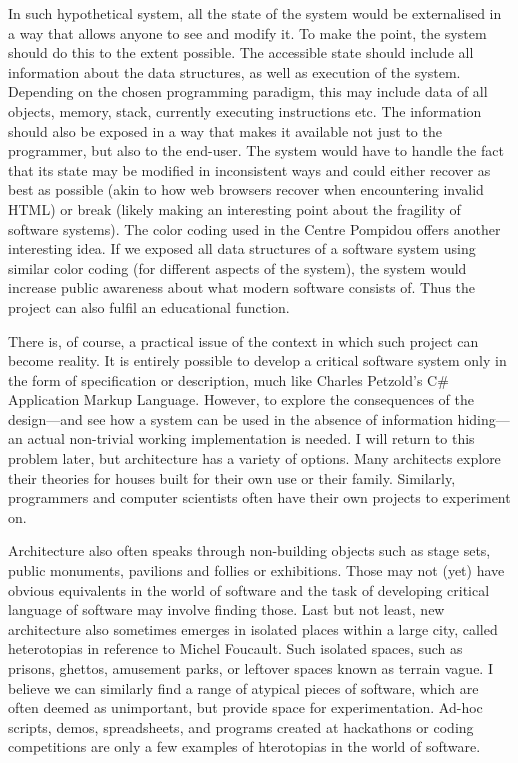 In such hypothetical system, all the state of the system
would be externalised in a way that allows anyone to see and modify it. To make the point,
the system should do this to the extent possible. The accessible state should include all
information about the data structures, as well as execution of the system. Depending on the
chosen programming paradigm, this may include data of all objects, memory, stack, currently
executing instructions etc. The information should also be exposed in a way that makes it
available not just to the programmer, but also to the end-user. The system would have to handle the fact that
its state may be modified in inconsistent ways and could either recover as best as possible
(akin to how web browsers recover when encountering invalid HTML) or break (likely making an
interesting point about the fragility of software systems).
The color coding used in the Centre Pompidou offers another interesting idea. If we exposed
all data structures of a software system using similar color coding (for different aspects
of the system), the system would increase public awareness about what modern software consists
of. Thus the project can also fulfil an educational function.

There is, of course, a practical issue of the context in which such project can become
reality. It is entirely possible to develop a critical software system only in the form of
specification or description, much like Charles Petzold's C\# Application Markup Language.
However, to explore the consequences of the design---and see how a system can be used in
the absence of information hiding---an actual non-trivial working implementation is needed.
I will return to this problem later, but architecture has a variety of options. Many
architects explore their theories for houses built for their own use or their
family. Similarly, programmers and computer
scientists often have their own projects to experiment on.

Architecture also often speaks through
non-building objects such as stage sets, public monuments, pavilions and follies or exhibitions.
Those may not (yet) have obvious equivalents in the world of software and the task of developing
critical language of software may involve finding those. Last but not least, new architecture
also sometimes emerges in isolated places within a large city, called heterotopias in reference
to Michel Foucault. Such isolated spaces, such as prisons, ghettos,
amusement parks, or leftover spaces known as terrain vague.
I believe we can similarly find a range of atypical pieces of software, which are often deemed
as unimportant, but provide space for experimentation. Ad-hoc scripts, demos, spreadsheets,
and programs created at hackathons or coding competitions are only a few examples of hterotopias
in the world of software.


